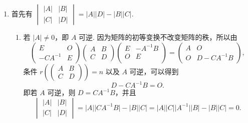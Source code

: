 \begin{enumerate}
    \item 首先有 $\begin{vmatrix}
                  \lvert A \rvert & \lvert B \rvert \\
                  \lvert C \rvert & \lvert D \rvert
              \end{vmatrix} = \lvert A \rvert \lvert D \rvert-\lvert B \rvert \lvert C \rvert$.
          \begin{enumerate}
              \item 若 $\lvert A \rvert \neq 0$，即 $A$ 可逆. 因为矩阵的初等变换不改变矩阵的秩，所以由
                    \[\begin{pmatrix}
                            E        & O \\
                            -CA^{-1} & E
                        \end{pmatrix} \begin{pmatrix}
                            A & B \\
                            C & D
                        \end{pmatrix} \begin{pmatrix}
                            E & -A^{-1}B \\
                            O & E        \\
                        \end{pmatrix} = \begin{pmatrix}
                            A & O          \\
                            O & D-CA^{-1}B
                        \end{pmatrix},\]
                    条件 $r\left(\begin{pmatrix}
                                A & B \\
                                C & D
                            \end{pmatrix}\right) = n$ 以及 $A$ 可逆，可以得到
                    \[D-CA^{-1}B = O.\]
                    即若 $A$ 可逆，则 $D = CA^{-1}B$，并且
                    \[\begin{vmatrix}
                            \lvert A \rvert & \lvert B \rvert \\
                            \lvert C \rvert & \lvert D \rvert
                        \end{vmatrix} = \lvert A \rvert \lvert CA^{-1}B \rvert-\lvert B \rvert \lvert C \rvert = \lvert A \rvert \lvert C \rvert \lvert A^{-1} \rvert \lvert B \rvert-\lvert B \rvert \lvert C \rvert = 0.\]


\end{enumerate}
\end{enumerate}
